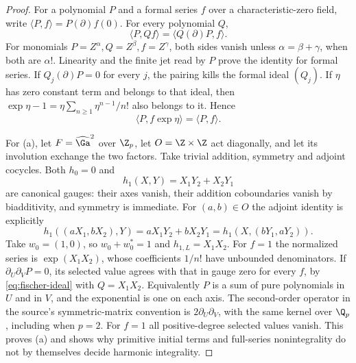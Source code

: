 \begin{proof}
For a polynomial $P$ and a formal series $f$ over a characteristic-zero field, write $\langle P,f\rangle=P(\partial)f(0)$. For every polynomial $Q$,
\begin{equation}\label{eq:fischer-ideal}
 \langle P,Qf\rangle=\langle Q(\partial)P,f\rangle.
\end{equation}
For monomials $P=Z^\alpha,Q=Z^\beta,f=Z^\gamma$, both sides vanish unless $\alpha=\beta+\gamma$, when both are $\alpha!$. Linearity and the finite jet read by $P$ prove the identity for formal series. If $Q_j(\partial)P=0$ for every $j$, the pairing kills the formal ideal $(Q_j)$. If $\eta$ has zero constant term and belongs to that ideal, then $\exp\eta-1=\eta\sum_{n\ge1}\eta^{n-1}/n!$ also belongs to it. Hence
\[
 \langle P,f\exp\eta\rangle=\langle P,f\rangle.
\]

For (a), let $F=\widehat\Ga^2$ over $\Z_p$, let $O=\Z\times\Z$ act diagonally, and let its involution exchange the two factors. Take trivial addition, symmetry and adjoint cocycles. Both $h_0=0$ and
\[
 h_1(X,Y)=X_1Y_2+X_2Y_1
\]
are canonical gauges: their axes vanish, their addition coboundaries vanish by biadditivity, and symmetry is immediate. For $(a,b)\in O$ the adjoint identity is explicitly
\[
 h_1((aX_1,bX_2),Y)=aX_1Y_2+bX_2Y_1
 =h_1(X,(bY_1,aY_2)).
\]
Take $w_0=(1,0)$, so $w_0+w_0^*=1$ and $h_{1,L}=X_1X_2$. For $f=1$ the normalized series is $\exp(X_1X_2)$, whose coefficients $1/n!$ have unbounded denominators. If $\partial_U\partial_VP=0$, its selected value agrees with that in gauge zero for every $f$, by \eqref{eq:fischer-ideal} with $Q=X_1X_2$. Equivalently $P$ is a sum of pure polynomials in $U$ and in $V$, and the exponential is one on each axis. The second-order operator in the source's symmetric-matrix convention is $2\partial_U\partial_V$, with the same kernel over $\Q_p$, including when $p=2$. For $f=1$ all positive-degree selected values vanish. This proves (a) and shows why primitive initial terms and full-series nonintegrality do not by themselves decide harmonic integrality.


\end{proof}
